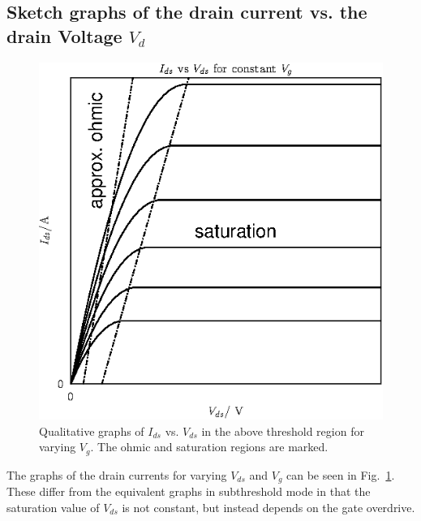 \subsection{Sketch graphs of the drain current vs. the drain Voltage \(V_d\)}
\begin{figure}
    \center
    \includegraphics{prelab2.eps}
    \caption{Qualitative graphs of \(I_{ds}\) vs. \(V_{ds}\) in the above threshold region for varying \(V_g\).
    The ohmic and saturation regions are marked.}
    \label{fig:q2}
\end{figure}
The graphs of the drain currents for varying \(V_{ds}\) and \(V_g\) can be seen in Fig.~\ref{fig:q2}. These
differ from the equivalent graphs in subthreshold mode in that the saturation value of \(V_{ds}\) is not 
constant, but instead depends on the gate overdrive.

